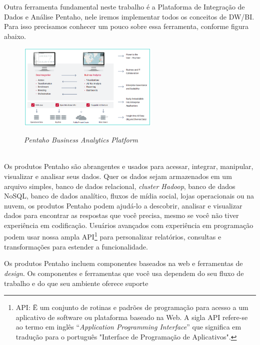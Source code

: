 Outra ferramenta fundamental neste trabalho \'{e} a Plataforma de Integra\c{c}\~{a}o de Dados e An\'{a}lise Pentaho, nele iremos implementar todos os conceitos de DW/BI. Para isso precisamos conhecer um pouco sobre essa ferramenta, conforme figura abaixo.

\begin{figure}[H]
	\vspace*{0,2cm}
    \centering
    \caption{\textit{Pentaho Business Analytics Platform}}
    \includegraphics[width=0.6\textwidth]{./04-figuras/figura-15}
    \label{fig:ilustfig15}
\end{figure}
\vspace*{-0,9cm}
{\raggedright {}}\\

Os produtos Pentaho s\~{a}o abrangentes e usados para acessar, integrar, manipular, visualizar e analisar seus dados. Quer os dados sejam armazenados em um arquivo simples, banco de dados relacional, \textit{cluster Hadoop}, banco de dados NoSQL, banco de dados analítico, fluxos de mídia social, lojas operacionais ou na nuvem, os produtos Pentaho podem ajud\'{a}-lo a descobrir, analisar e visualizar dados para encontrar as respostas que você precisa, mesmo se você n\~{a}o tiver experiência em codifica\c{c}\~{a}o. 
Usu\'{a}rios avan\c{c}ados com experiência em programa\c{c}\~{a}o podem usar nossa ampla API\footnote{API: Ë um conjunto de rotinas e padr\~{o}es de programa\c{c}\~{a}o para acesso a um aplicativo de software ou plataforma baseado na Web. A sigla API refere-se ao termo em inglês ``\textit{Application Programming Interface}'' que significa em tradu\c{c}\~{a}o para o português "Interface de Programa\c{c}\~{a}o de Aplicativos".} para personalizar relat\'orios, consultas e transforma\c{c}\~{o}es para estender a funcionalidade.

Os produtos Pentaho incluem componentes baseados na web e ferramentas de \textit{design}. Os componentes e ferramentas que você usa dependem do seu fluxo de trabalho e do que seu ambiente oferece suporte

